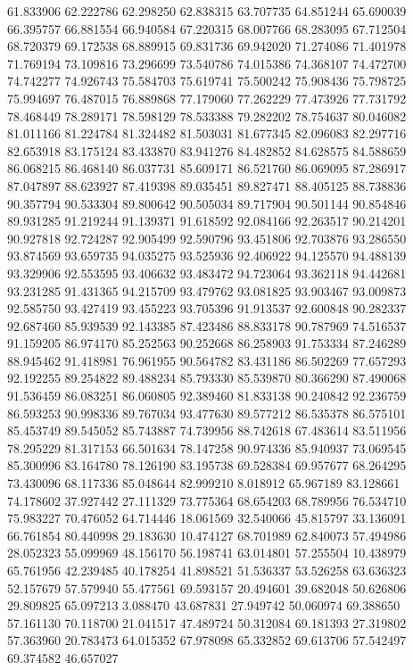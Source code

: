 61.833906
62.222786
62.298250
62.838315
63.707735
64.851244
65.690039
66.395757
66.881554
66.940584
67.220315
68.007766
68.283095
67.712504
68.720379
69.172538
68.889915
69.831736
69.942020
71.274086
71.401978
71.769194
73.109816
73.296699
73.540786
74.015386
74.368107
74.472700
74.742277
74.926743
75.584703
75.619741
75.500242
75.908436
75.798725
75.994697
76.487015
76.889868
77.179060
77.262229
77.473926
77.731792
78.468449
78.289171
78.598129
78.533388
79.282202
78.754637
80.046082
81.011166
81.224784
81.324482
81.503031
81.677345
82.096083
82.297716
82.653918
83.175124
83.433870
83.941276
84.482852
84.628575
84.588659
86.068215
86.468140
86.037731
85.609171
86.521760
86.069095
87.286917
87.047897
88.623927
87.419398
89.035451
89.827471
88.405125
88.738836
90.357794
90.533304
89.800642
90.505034
89.717904
90.501144
90.854846
89.931285
91.219244
91.139371
91.618592
92.084166
92.263517
90.214201
90.927818
92.724287
92.905499
92.590796
93.451806
92.703876
93.286550
93.874569
93.659735
94.035275
93.525936
92.406922
94.125570
94.488139
93.329906
92.553595
93.406632
93.483472
94.723064
93.362118
94.442681
93.231285
91.431365
94.215709
93.479762
93.081825
93.903467
93.009873
92.585750
93.427419
93.455223
93.705396
91.913537
92.600848
90.282337
92.687460
85.939539
92.143385
87.423486
88.833178
90.787969
74.516537
91.159205
86.974170
85.252563
90.252668
86.258903
91.753334
87.246289
88.945462
91.418981
76.961955
90.564782
83.431186
86.502269
77.657293
92.192255
89.254822
89.488234
85.793330
85.539870
80.366290
87.490068
91.536459
86.083251
86.060805
92.389460
81.833138
90.240842
92.236759
86.593253
90.998336
89.767034
93.477630
89.577212
86.535378
86.575101
85.453749
89.545052
85.743887
74.739956
88.742618
67.483614
83.511956
78.295229
81.317153
66.501634
78.147258
90.974336
85.940937
73.069545
85.300996
83.164780
78.126190
83.195738
69.528384
69.957677
68.264295
73.430096
68.117336
85.048644
82.999210
8.018912
65.967189
83.128661
74.178602
37.927442
27.111329
73.775364
68.654203
68.789956
76.534710
75.983227
70.476052
64.714446
18.061569
32.540066
45.815797
33.136091
66.761854
80.440998
29.183630
10.474127
68.701989
62.840073
57.494986
28.052323
55.099969
48.156170
56.198741
63.014801
57.255504
10.438979
65.761956
42.239485
40.178254
41.898521
51.536337
53.526258
63.636323
52.157679
57.579940
55.477561
69.593157
20.494601
39.682048
50.626806
29.809825
65.097213
3.088470
43.687831
27.949742
50.060974
69.388650
57.161130
70.118700
21.041517
47.489724
50.312084
69.181393
27.319802
57.363960
20.783473
64.015352
67.978098
65.332852
69.613706
57.542497
69.374582
46.657027
